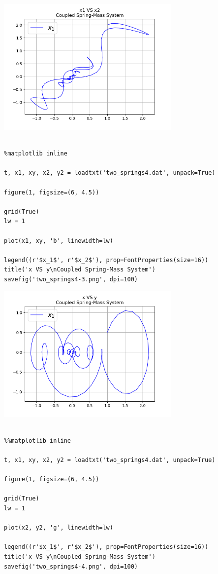 \documentclass{article} %
\begin{document}
\begin{center}
 	\includegraphics[width=9cm]{two_springs4-2.png}
 \end{center}


\begin{verbatim} 

%matplotlib inline

t, x1, xy, x2, y2 = loadtxt('two_springs4.dat', unpack=True)

figure(1, figsize=(6, 4.5))

grid(True)
lw = 1

plot(x1, xy, 'b', linewidth=lw)

legend((r'$x_1$', r'$x_2$'), prop=FontProperties(size=16))
title('x VS y\nCoupled Spring-Mass System')
savefig('two_springs4-3.png', dpi=100)

\end{verbatim}



\begin{center}
 	\includegraphics[width=9cm]{two_springs4-3.png}
 \end{center}



\begin{verbatim} 

%%matplotlib inline

t, x1, xy, x2, y2 = loadtxt('two_springs4.dat', unpack=True)

figure(1, figsize=(6, 4.5))

grid(True)
lw = 1

plot(x2, y2, 'g', linewidth=lw)

legend((r'$x_1$', r'$x_2$'), prop=FontProperties(size=16))
title('x VS y\nCoupled Spring-Mass System')
savefig('two_springs4-4.png', dpi=100)

\end{verbatim}
\end{document}
